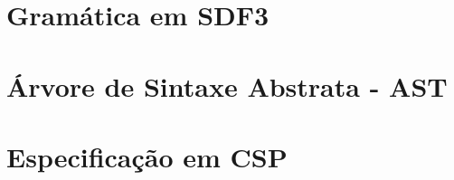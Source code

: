 \appendix

\chapter{Gramática em SDF3}
\label{apendice1}






\chapter{Árvore de Sintaxe Abstrata - AST}
\label{apendice2}


\chapter{Especificação em CSP}
\label{apendice4}


